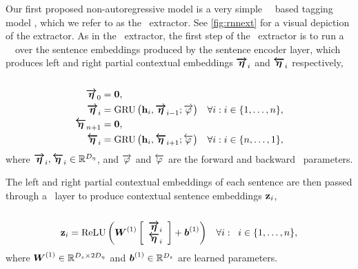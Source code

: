 

Our first proposed non-autoregressive model is a very simple
\bidirectional~\recurrentneuralnetwork~based tagging model
\citep{graves2005,wang2015}, which we refer to as the \rnnext~extractor.  See
\autoref{fig:rnnext} for a visual depiction of   the extractor.  As in the
\srext~extractor, the first step of the \rnnext~extractor is to run a
\bidirectional~\recurrentneuralnetwork~over the sentence embeddings produced by
the sentence encoder layer, which produces left and right partial contextual
embeddings $\boldsymbol{\overrightarrow{\eta}}_i$ and $\boldsymbol{\overleftarrow{\eta}}_i$ respectively,\\

\\[-40pt]
\begin{align}
    \boldsymbol{\overrightarrow{\eta}}_0 & = \mathbf{0},\\ 
 \boldsymbol{\overrightarrow{\eta}}_i &= \operatorname{GRU}\left(\mathbf{h}_i, \boldsymbol{\overrightarrow{\eta}}_{i-1}; \overrightarrow{\varphi}\right) &
    \forall i : i \in \{1,\ldots,n\}, \\
  \boldsymbol{\overleftarrow{\eta}}_{n+1} & = \mathbf{0}, \\
 \boldsymbol{\overleftarrow{\eta}}_i &= \operatorname{GRU}\left(\mathbf{h}_i, \boldsymbol{\overleftarrow{\eta}}_{i+1};\overleftarrow{\varphi}\right) &
    \forall i : i \in \{n, \ldots, 1\}, 
\end{align}
where $\boldsymbol{\overrightarrow{\eta}}_i,\boldsymbol{\overleftarrow{\eta}}_i \in \mathbb{R}^{{D_\eta}}$,
and $\overrightarrow{\varphi}$ and $\overleftarrow{\varphi}$ are the forward and backward
\gru~parameters.

The left and right partial contextual embeddings of each sentence 
are then passed through a \feedforward~layer to produce contextual
sentence embeddings $\mathbf{z}_i$,\\

\\[-35pt]
\begin{align}
   \mathbf{z}_i &= \operatorname{ReLU}\left(
    \boldsymbol{W}^{(1)}
    \left[ \begin{array}{c} 
        \boldsymbol{\overrightarrow{\eta}}_i \\
        \boldsymbol{\overleftarrow{\eta}}_i \end{array}\right] + \boldsymbol{b}^{(1)} \right)
    & \forall i :\;\; i \in \{1,\ldots,n\},
\end{align}
where $\boldsymbol{W}^{(1)} \in \mathbb{R}^{{D_z} \times 2 {D_\eta}}$
and $\boldsymbol{b}^{(1)} \in \mathbb{R}^{{D_z}}$ are learned parameters.

